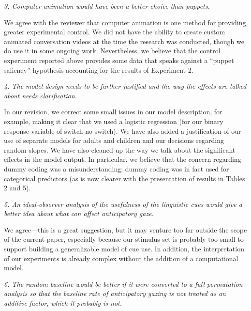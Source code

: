 \documentclass[11pt,a4paper]{letter} %
\begin{document}
\begin{letter}{}
\noindent \textit{3. Computer animation would have been a better choice than puppets.}

\noindent We agree with the reviewer that computer animation is one method for providing greater experimental control. We did not have the ability to create custom animated conversation videos at the time the research was conducted, though we do use it in some ongoing work. Nevertheless, we believe that the control experiment reported above provides some data that speaks against a ``puppet saliency'' hypothesis accounting for the results of Experiment 2. 

\smallskip

\noindent \textit{4. The model design needs to be further justified and the way the effects are talked about needs clarification.}

\noindent In our revision, we correct some small issues in our model description, for example, making it clear that we used a logistic regression (for our binary response variable of switch-no switch). We have also added a justification of our use of separate models for adults and children and our decisions regarding random slopes. We have also cleaned up the way we talk about the significant effects in the model output. In particular, we believe that the concern regarding dummy coding was a misunderstanding; dummy coding was in fact used for categorical predictors (as is now clearer with the presentation of results in Tables 2 and 5).

\smallskip

\noindent \textit{5. An ideal-observer analysis of the usefulness of the linguistic cues would give a better idea about what can affect anticipatory gaze.}

\noindent We agree---this is a great suggestion, but it may venture too far outside the scope of the current paper, especially because our stimulus set is probably too small to support building a generalizable model of cue use. In addition, the interpretation of our experiments is already complex without the addition of a computational model.  

\smallskip

\noindent \textit{6. The random baseline would be better if it were converted to a full permutation analysis so that the baseline rate of anticipatory gazing is not treated as an additive factor, which it probably is not.}


\end{letter}
\end{document}
